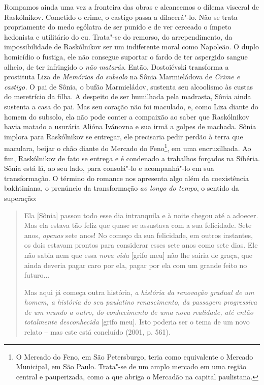 {{Rompamos ainda uma vez a fronteira das obras e alcancemos o dilema
visceral de Raskólnikov. Cometido o crime, o castigo passa a
dilacerá"-lo. Não se trata propriamente do medo ególatra de ser punido e
de ver cerceado o ímpeto hedonista e utilitário do eu. Trata"-se do
remorso, do arrependimento, da impossibilidade de Raskólnikov ser um
indiferente moral como Napoleão. O duplo homicídio o fustiga, ele não
consegue suportar o fardo de ter aspergido sangue alheio, de ter
infringido o \emph{não matarás.} Então, Dostoiévski transforma a
prostituta Liza de \emph{Memórias do subsolo} na Sônia Marmieládova de
\emph{Crime e castigo.} O pai de Sônia, o bufão Marmieládov, sustenta
seu alcoolismo às custas do meretrício da filha. A despeito de ser
humilhada pela madrasta, Sônia ainda sustenta a casa do pai. Mas seu
coração não foi maculado, e, como Liza diante do homem do subsolo, ela
não pode conter a compaixão ao saber que Raskólnikov havia matado a
usurária Alióna Ivánovna e sua irmã a golpes de machada. Sônia implora
para Raskólnikov se entregar, ele precisaria pedir perdão à terra que
maculara, beijar o chão diante do Mercado do Feno\footnote{O Mercado do
  Feno, em São Petersburgo, teria como equivalente o Mercado Municipal,
  em São Paulo. Trata"-se de um amplo mercado em uma região central e
  pauperizada, como a que abriga o Mercadão na capital paulistana.}, em
uma encruzilhada. Ao fim, Raskólnikov de fato se entrega e é condenado a
trabalhos forçados na Sibéria. Sônia está lá, ao seu lado, para
consolá"-lo e acompanhá"-lo em sua transformação. O término do romance nos
apresenta algo além da coexistência bakhtiniana, o prenúncio da
transformação \emph{ao longo do tempo}, o sentido da superação:

\begin{quote}
Ela {[}Sônia{]} passou todo esse dia intranquila e à noite chegou até a
adoecer. Mas ela estava tão feliz que quase se assustava com a sua
felicidade. Sete anos, \emph{apenas} sete anos! No começo da sua
felicidade, em outros instantes, os dois estavam prontos para considerar
esses sete anos como sete dias. Ele não sabia nem que essa \emph{nova
vida} {[}grifo meu{]} não lhe sairia de graça, que ainda deveria pagar
caro por ela, pagar por ela com um grande feito no futuro...

Mas aqui já começa outra história, \emph{a história da renovação gradual
de um homem, a história do seu paulatino renascimento, da passagem
progressiva de um mundo a outro, do conhecimento de uma nova realidade,
até então totalmente desconhecida} {[}grifo meu{]}. Isto poderia ser o
tema de um novo relato -- mas este está concluído (2001, p. 561).
\end{quote}

}}
